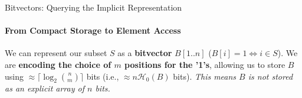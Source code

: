\begin{frame}{Bitvectors: Querying the Implicit Representation}
    \framesubtitle{From Compact Storage to Element Access}

    We can represent our subset $S$ as a \textbf{bitvector} $B[1..n]$ ($B[i]=1 \iff i \in S$). We are \textbf{encoding the choice of $m$ positions for the '1's}, allowing us to store $B$ using $\approx \lceil \log_2 \binom{n}{m} \rceil$ bits (i.e., $\approx n \mathcal{H}_0(B)$ bits). \textit{This means $B$ is not stored as an explicit array of $n$ bits.}

    \begin{figure}[htbp]
        \centering
        \vspace{-0.5em} %
    \end{figure}

    \pause %


    \pause %


\end{frame}
